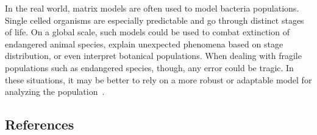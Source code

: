 \documentclass{article}
\begin{document}
    In the real world, matrix models are often used to model bacteria populations.
    Single celled organisms are especially predictable and go through distinct stages of life.
    On a global scale, such models could be used to combat extinction of endangered animal species, explain unexpected phenomena based on stage distribution, or even interpret botanical populations.
    When dealing with fragile populations such as endangered species, though, any error could be tragic.
    In these situations, it may be better to rely on a more robust or adaptable model for analyzing the population~\cite{hendricks_55_2021}.

    \newpage
    \begin{center}
        \section{References}\label{sec:references}
    \end{center}

    \printbibliography[heading=none]
\end{document}
